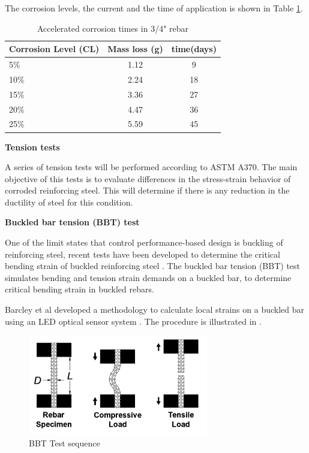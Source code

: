 The corrosion levels, the current and the time of application is shown in Table \ref{tab:AcceleratedCorrosionTime}. 

\begin{table}[htbp]
	\caption{Accelerated corrosion times in 3/4" rebar}
	\label{tab:AcceleratedCorrosionTime}
	\centering	
		\begin{tabular}{|l|c|c|}
		\hline
		Corrosion Level (CL) & Mass loss (g)   & time(days)     \\  \hline	
		5\%                  & 1.12            & 9  \\  \hline	
		10\%                 & 2.24            & 18 \\  \hline	
		15\%                 & 3.36            & 27 \\  \hline	
		20\%                 & 4.47            & 36 \\  \hline	
		25\%                 & 5.59            & 45 \\  \hline	
		\end{tabular}
\end{table}
\newpage

\textbf{Tension tests}

A series of tension tests will be performed according to ASTM A370. The main objective of this tests is to evaluate differences in the stress-strain behavior of corroded reinforcing steel. This will determine if there is any reduction in the ductility of steel for this condition.
\newline

\textbf{Buckled bar tension (BBT) test}

One of the limit states that control performance-based design is buckling of reinforcing steel, recent tests have been developed to determine the critical bending strain of buckled reinforcing steel \cite{Barcley2019}. The buckled bar tension (BBT) test simulates bending and tension strain demands on a buckled bar, to determine critical bending strain in buckled rebars. 

Barcley et al \cite{Barcley2019} developed a methodology to calculate local strains on a buckled bar using an LED optical sensor system \cite{NorthernDigitalInc.2020}. The procedure is illustrated in .

\begin{figure}[htbp]
	\centering
	\includegraphics[width=0.7\textwidth]{Chapter-3/figs/BBT_Sequence}
	\caption{BBT Test sequence\cite{Barcley2019}}
	\label{fig:BBTseq}
\end{figure}

